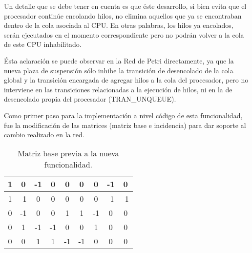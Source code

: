 Un detalle que se debe tener en cuenta es que éste desarrollo, si bien evita que el procesador continúe encolando hilos, no elimina aquellos que ya se encontraban dentro de la cola asociada al CPU. En otras palabras, los hilos ya encolados, serán ejecutados en el momento correspondiente pero no podrán volver a la cola de este CPU inhabilitado.\par

Ésta aclaración se puede observar en la Red de Petri directamente, ya que la nueva plaza de suspensión sólo inhibe la transición de desencolado de la cola global y la transición encargada de agregar hilos a la cola del procesador, pero no interviene en las transiciones relacionadas a la ejecución de hilos, ni en la de desencolado propia del procesador (TRAN\_UNQUEUE).\par


Como primer paso para la implementación a nivel código de esta funcionalidad, fue la modificación de las matrices (matriz base e incidencia) para dar soporte al cambio realizado en la red.\par

\renewcommand{\arraystretch}{1.5}
\setlength{\tabcolsep}{10pt}

\begin{table}[H]
    \centering
    \begin{tabular}{|c|c|c|c|c|c|c|c|c|}
        \hline
        1 & 0 & -1 & 0 & 0 & 0 & 0 & -1 & 0 \\
        \hline
        1 & -1 & 0 & 0 & 0 & 0 & 0 & -1 & -1 \\
        \hline
        0 & -1 & 0 & 0 & 1 & 1 & -1 & 0 & 0 \\
        \hline
        0 & 1 & -1 & -1 & 0 & 0 & 1 & 0 & 0 \\
        \hline
        0 & 0 & 1 & 1 & -1 & -1 & 0 & 0 & 0 \\
        \hline
    \end{tabular}
    \caption{Matriz base previa a la nueva funcionalidad.}
    \label{tabla:matriz_base_pre}
\end{table}

